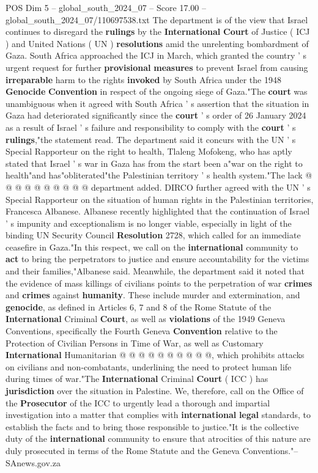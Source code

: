 \begin{textsample}{POS Dim 5 – global\_south\_2024\_07 – Score 17.00 – global\_south\_2024\_07/110697538.txt}  \label{ex:f5_pos_163}
The department is of the view that Israel continues to disregard the \textbf{rulings} by the \textbf{International} \textbf{Court} of Justice ( ICJ ) and United Nations ( UN ) \textbf{resolutions} amid the unrelenting bombardment of Gaza.
South Africa approached the ICJ in March, which granted the country ' s urgent request for further \textbf{provisional} \textbf{measures} to prevent Israel from causing \textbf{irreparable} harm to the rights \textbf{invoked} by South Africa under the 1948 \textbf{Genocide} \textbf{Convention} in respect of the ongoing siege of Gaza."The \textbf{court} was unambiguous when it agreed with South Africa ' s assertion that the situation in Gaza had deteriorated significantly since the \textbf{court} ' s order of 26 January 2024 as a result of Israel ' s failure and responsibility to comply with the \textbf{court} ' s \textbf{rulings},"the statement read.
The department said it concurs with the UN ' s Special Rapporteur on the right to health, Tlaleng Mofokeng, who has aptly stated that Israel ' s war in Gaza has from the start been a"war on the right to health"and has"obliterated"the Palestinian territory ' s health system."The lack @ @ @ @ @ @ @ @ @ @ department added.
DIRCO further agreed with the UN ' s Special Rapporteur on the situation of human rights in the Palestinian territories, Francesca Albanese.
Albanese recently highlighted that the continuation of Israel ' s impunity and exceptionalism is no longer viable, especially in light of the binding UN Security Council \textbf{Resolution} 2728, which called for an immediate ceasefire in Gaza."In this respect, we call on the \textbf{international} community to \textbf{act} to bring the perpetrators to justice and ensure accountability for the victims and their families,"Albanese said.
Meanwhile, the department said it noted that the evidence of mass killings of civilians points to the perpetration of war \textbf{crimes} and \textbf{crimes} against \textbf{humanity}.
These include murder and extermination, and \textbf{genocide}, as defined in Articles 6, 7 and 8 of the Rome Statute of the \textbf{International} Criminal \textbf{Court}, as well as \textbf{violations} of the 1949 Geneva Conventions, specifically the Fourth Geneva \textbf{Convention} relative to the Protection of Civilian Persons in Time of War, as well as Customary \textbf{International} Humanitarian @ @ @ @ @ @ @ @ @ @, which prohibits attacks on civilians and non-combatants, underlining the need to protect human life during times of war."The \textbf{International} Criminal \textbf{Court} ( ICC ) has \textbf{jurisdiction} over the situation in Palestine.
We, therefore, call on the Office of the \textbf{Prosecutor} of the ICC to urgently lead a thorough and impartial investigation into a matter that complies with \textbf{international} \textbf{legal} standards, to establish the facts and to bring those responsible to justice."It is the collective duty of the \textbf{international} community to ensure that atrocities of this nature are duly prosecuted in terms of the Rome Statute and the Geneva Conventions."-- SAnews.gov.za


\end{textsample}
